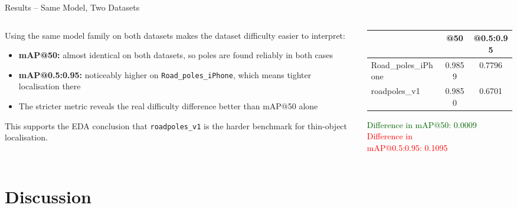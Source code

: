 \documentclass[aspectratio=169]{beamer}
\begin{document}
\begin{frame}{Results -- Same Model, Two Datasets}
  \begin{columns}
    \begin{column}{0.55\textwidth}
      Using the same model family on both datasets makes the dataset difficulty easier to interpret:
      \vspace{0.5em}
      \begin{itemize}
        \item \textbf{mAP@50:} almost identical on both datasets, so poles are found reliably in both cases
        \item \textbf{mAP@0.5:0.95:} noticeably higher on \texttt{Road\_poles\_iPhone}, which means tighter localisation there
        \item The stricter metric reveals the real difficulty difference better than mAP@50 alone
      \end{itemize}
      \vspace{0.5em}
      This supports the EDA conclusion that \texttt{roadpoles\_v1} is the harder benchmark for thin-object localisation.
    \end{column}
    \begin{column}{0.42\textwidth}
      \begin{table}
        \renewcommand{\arraystretch}{1.4}
        \begin{tabular}{lcc}
          \toprule
          & \textbf{@50} & \textbf{@0.5:0.95} \\
          \midrule
          Road\_poles\_iPhone & 0.9859 & 0.7796 \\
          roadpoles\_v1       & 0.9850 & 0.6701 \\
          \bottomrule
        \end{tabular}
      \end{table}
      \vspace{0.5em}
      \textcolor{darkgreen}{Difference in mAP@50: 0.0009}\\
      \textcolor{red}{Difference in}\\
      \textcolor{red}{mAP@0.5:0.95: 0.1095}
    \end{column}
  \end{columns}
\end{frame}

\section{Discussion}
\end{document}
